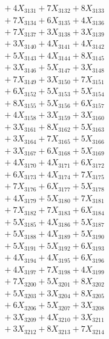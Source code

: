 \documentclass[a4paper,10pt]{article}
\begin{document}
{\begin{align}
&\;  + 4 X_{3131} + 7 X_{3132} + 8 X_{3133} \\[0.3ex]
&\;  + 7 X_{3134} + 6 X_{3135} + 4 X_{3136} \\[0.3ex]
&\;  + 7 X_{3137} + 3 X_{3138} + 3 X_{3139} \\[0.3ex]
&\;  + 3 X_{3140} + 4 X_{3141} + 4 X_{3142} \\[0.3ex]
&\;  + 5 X_{3143} + 4 X_{3144} + 8 X_{3145} \\[0.3ex]
&\;  + 3 X_{3146} + 5 X_{3147} + 3 X_{3148} \\[0.3ex]
&\;  + 7 X_{3149} + 3 X_{3150} + 7 X_{3151} \\[0.3ex]
&\;  + 6 X_{3152} + 5 X_{3153} + 5 X_{3154} \\[0.3ex]
&\;  + 8 X_{3155} + 5 X_{3156} + 6 X_{3157} \\[0.3ex]
&\;  + 4 X_{3158} + 3 X_{3159} + 3 X_{3160} \\[0.5ex]\allowbreak
&\;  + 3 X_{3161} + 8 X_{3162} + 5 X_{3163} \\[0.3ex]
&\;  + 3 X_{3164} + 7 X_{3165} + 5 X_{3166} \\[0.3ex]
&\;  + 3 X_{3167} + 6 X_{3168} + 5 X_{3169} \\[0.3ex]
&\;  + 4 X_{3170} + 4 X_{3171} + 6 X_{3172} \\[0.3ex]
&\;  + 6 X_{3173} + 4 X_{3174} + 7 X_{3175} \\[0.3ex]
&\;  + 7 X_{3176} + 6 X_{3177} + 5 X_{3178} \\[0.3ex]
&\;  + 4 X_{3179} + 5 X_{3180} + 7 X_{3181} \\[0.3ex]
&\;  + 7 X_{3182} + 7 X_{3183} + 6 X_{3184} \\[0.3ex]
&\;  + 5 X_{3185} + 4 X_{3186} + 5 X_{3187} \\[0.3ex]
&\;  + 5 X_{3188} + 4 X_{3189} + 5 X_{3190} \\[0.5ex]\allowbreak
&\;  + 5 X_{3191} + 5 X_{3192} + 6 X_{3193} \\[0.3ex]
&\;  + 4 X_{3194} + 4 X_{3195} + 6 X_{3196} \\[0.3ex]
&\;  + 4 X_{3197} + 7 X_{3198} + 4 X_{3199} \\[0.3ex]
&\;  + 7 X_{3200} + 5 X_{3201} + 8 X_{3202} \\[0.3ex]
&\;  + 5 X_{3203} + 3 X_{3204} + 8 X_{3205} \\[0.3ex]
&\;  + 6 X_{3206} + 5 X_{3207} + 3 X_{3208} \\[0.3ex]
&\;  + 3 X_{3209} + 4 X_{3210} + 3 X_{3211} \\[0.3ex]
&\;  + 3 X_{3212} + 8 X_{3213} + 7 X_{3214} \\[0.3ex]

\end{align}}
\end{document}
